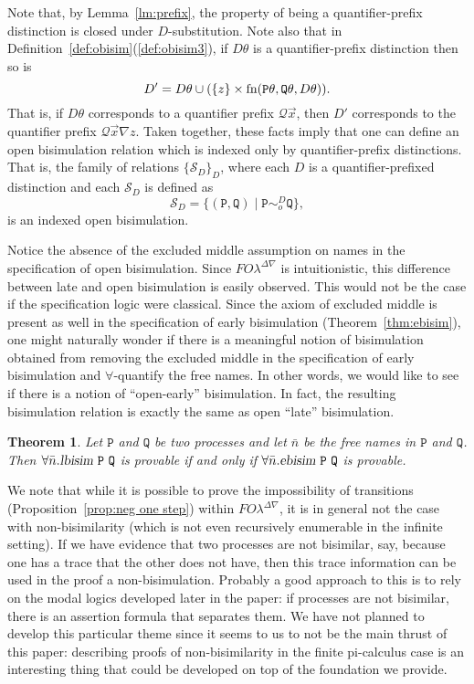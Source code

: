 \documentclass{acmtrans2m}
\newtheorem{theorem}{Theorem}
\def\Qscr{{\mathcal Q}}
\def\Sscr{{\mathcal S}}
\def\Ppi{{\mathtt P}}
\def\Qpi{{\mathtt Q}}
\newcommand{\FOL   }{FO\lambda}
\newcommand{\FOLDNb}{\FOL^{\Delta\nabla}}
\newcommand{\ebisim}[2]{\hbox{\sl ebisim}~#1~#2}
\newcommand{\lbisim}[2]{\hbox{\sl lbisim}~#1~#2}
\newcommand{\fn}[1]{{\rm fn}(#1)}
\begin{document}
Note that, by Lemma~\ref{lm:prefix}, the property of being a quantifier-prefix distinction
is closed under $D$-substitution. Note also that in Definition~\ref{def:obisim}(\ref{def:obisim3}),
if $D\theta$ is a quantifier-prefix distinction then so is 
$$
D' = D\theta \cup 
  (\{z\} \times \fn{\Ppi\theta,\Qpi\theta, D\theta}).
$$
That is, if $D\theta$ corresponds to a quantifier prefix $\Qscr \vec x$,
then $D'$ corresponds to the quantifier prefix $\Qscr \vec x \nabla z.$
Taken together, these facts imply that one can define 
an open bisimulation relation which is indexed only by 
quantifier-prefix distinctions. That is, the family of relations $\{\Sscr_D \}_D$,
where each $D$ is a quantifier-prefixed distinction and each $\Sscr_D$ is defined as
$$
\Sscr_D = \{(\Ppi,\Qpi) \mid \Ppi \sim^D_o \Qpi \},
$$
is an indexed open bisimulation. 


Notice the absence of the excluded middle assumption on names in the
specification of open bisimulation. Since $\FOLDNb$ is
intuitionistic, this difference between late and open bisimulation is
easily observed.  This would not be the case if the specification logic were
classical.  Since the axiom of excluded middle is present as well in
the specification of early bisimulation (Theorem~\ref{thm:ebisim}),
one might naturally wonder if there is a meaningful notion of
bisimulation obtained from removing the excluded middle in the
specification of early bisimulation and $\forall$-quantify the free names.
In other words, we would like to see if there is a
notion of ``open-early'' bisimulation. In fact, 
the resulting bisimulation relation is exactly the same as open ``late''
bisimulation.


\begin{theorem}
\label{thm:open-early-bisim}
Let $\Ppi$ and $\Qpi$ be two processes and let $\bar n$ be the 
free names in $\Ppi$ and $\Qpi$. Then 
$\forall \bar n. \lbisim {\Ppi}{\Qpi}$ is provable if and only if
$\forall \bar n. \ebisim{\Ppi}{\Qpi}$ is provable.
\end{theorem}

We note that while it is possible to prove the impossibility
of transitions (Proposition~\ref{prop:neg one step}) within $\FOLDNb$, 
it is in general not the case with non-bisimilarity (which is 
not even recursively enumerable in the infinite setting). 
If we have evidence that two processes are not
bisimilar, say, because one has a trace that the other does not have,
then this trace information can be used in the proof a
non-bisimulation.  Probably a good approach to this is to rely on
the modal logics developed later in the paper: if processes are not
bisimilar, there is an assertion formula that separates them.  We
have not planned to develop this particular theme since it seems to
us to not be the main thrust of this paper: describing proofs of
non-bisimilarity in the finite pi-calculus case is an interesting thing 
that could be developed on top of the foundation we provide.
\end{document}
